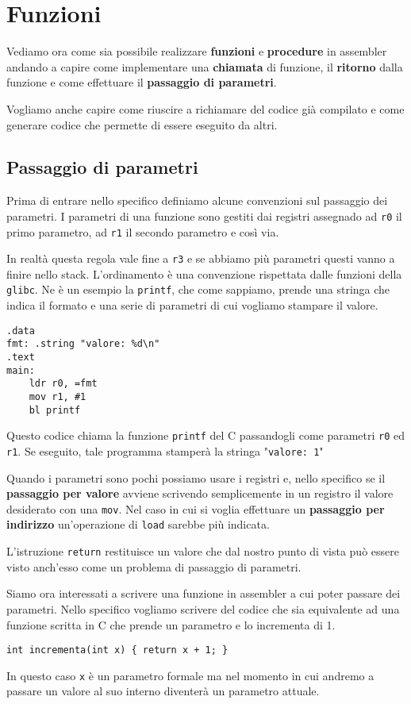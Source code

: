\section{Funzioni}
Vediamo ora come sia possibile realizzare \textbf{funzioni} e \textbf{procedure} in assembler
andando a capire come implementare una \textbf{chiamata} di funzione, il \textbf{ritorno} dalla
funzione e come effettuare il \textbf{passaggio di parametri}.

Vogliamo anche capire come riuscire a richiamare del codice già compilato e come generare codice
che permette di essere eseguito da altri.

\subsection{Passaggio di parametri}
Prima di entrare nello specifico definiamo alcune convenzioni sul passaggio dei parametri. I
parametri di una funzione sono gestiti dai registri assegnado ad \verb|r0| il primo parametro,
ad \verb|r1| il secondo parametro e così via.

In realtà questa regola vale fine a \verb|r3| e se abbiamo più parametri questi vanno a finire
nello stack. L'ordinamento è una convenzione rispettata dalle funzioni della \verb|glibc|. Ne è un
esempio la \verb|printf|, che come sappiamo, prende una stringa che indica il formato e una serie
di parametri di cui vogliamo stampare il valore.
\begin{verbatim}
.data
fmt: .string "valore: %d\n"
.text
main:
	ldr r0, =fmt
	mov r1, #1
	bl printf
\end{verbatim}
Questo codice chiama la funzione \verb|printf| del C passandogli come parametri \verb|r0| ed
\verb|r1|. Se eseguito, tale programma stamperà la stringa "\verb|valore: 1|"

Quando i parametri sono pochi possiamo usare i registri e, nello specifico se il
\textbf{passaggio per valore} avviene scrivendo semplicemente in un registro il valore desiderato
con una \verb|mov|. Nel caso in cui si voglia effettuare un \textbf{passaggio per indirizzo}
un'operazione di \verb|load| sarebbe più indicata.

L'istruzione \verb|return| restituisce un valore che dal nostro punto di vista può essere visto
anch'esso come un problema di passaggio di parametri.

Siamo ora interessati a scrivere una funzione in assembler a cui poter passare dei parametri. Nello
specifico vogliamo scrivere del codice che sia equivalente ad una funzione scritta in C che prende
un parametro e lo incrementa di 1.
\begin{verbatim}
int incrementa(int x) { return x + 1; }
\end{verbatim}
In questo caso \verb|x| è un parametro formale ma nel momento in cui andremo a passare un valore
al suo interno diventerà un parametro attuale.

